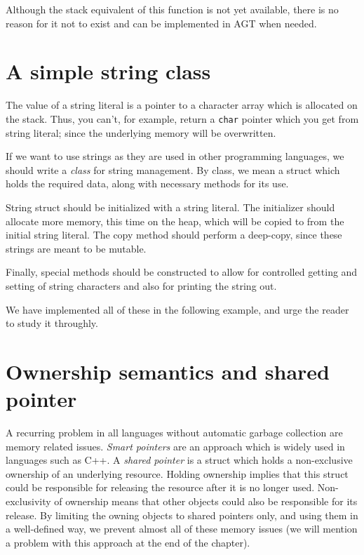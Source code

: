 \documentclass[times, utf8, diplomski]{fer}
\theoremstyle{definition}
\newcommand{\textcode}[3]{
    
}
\begin{document}
Although the stack equivalent of this function is not yet available, there
is no reason for it not to exist and can be implemented in AGT when needed.

\section{A simple string class}

The value of a string literal is a pointer to a character array
which is allocated on the stack. Thus, you can't, for example, return
a \texttt{char} pointer which you get from string literal;
since the underlying memory will be overwritten.

If we want to use strings as they are used in other programming languages,
we should write a \textit{class} for string management.
By class, we mean a struct which holds the required data, along with necessary methods for its use.

String struct should be initialized with a string literal.
The initializer should allocate more memory, this time on the heap,
which will be copied to from the initial string literal.
The copy method should perform a deep-copy, since these strings are meant to be mutable.

Finally, special methods should be constructed to allow for controlled getting and setting of
string characters and also for printing the string out.

We have implemented all of these in the following example, and urge the reader
to study it throughly.

\textcode{\resdir/programs/string_mgmt.agt}{string_cl}{String class}
\textcode{\resdir/programs/string_mgmt.out}{string_cl_out}{String class - output}

\section{Ownership semantics and shared pointer}

A recurring problem in all languages without automatic garbage collection are memory related issues.
\textit{Smart pointers} are an approach which is widely used in languages such as C++.
A \textit{shared pointer} is a struct which holds a non-exclusive ownership of an underlying resource.
Holding ownership implies that this struct could be responsible for releasing the resource after it
is no longer used. Non-exclusivity of ownership means that other objects could also be responsible
for its release. By limiting the owning objects to shared pointers only, and using them in a
well-defined way, we prevent almost all of these memory issues (we will mention a problem with this approach
at the end of the chapter).
\end{document}
